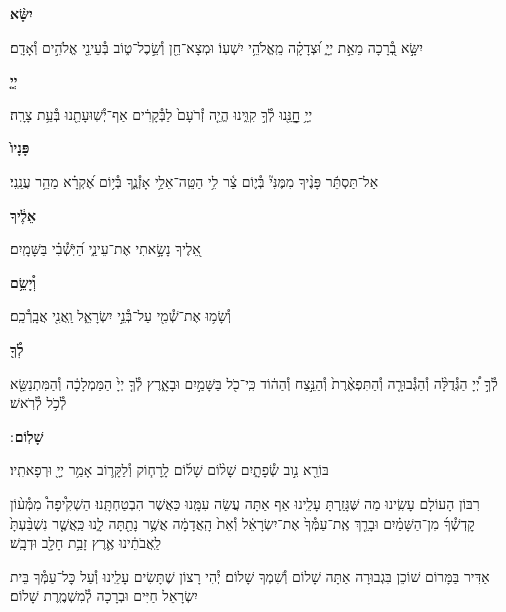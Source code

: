 \documentclass[twoside, openany, parskip=half, 11pt]{book}
\begin{document}
\textbf{יִשָּׂ֨א}
\hfill \begin{footnotesize}
יִשָּׂ֣א בְ֭֯רָכָה מֵאֵ֣ת יְיָ֑ וּ֝צְדָקָ֗ה מֵֽאֱלֹהֵ֥י יִשְׁעֽוֹ׃ וּמְצָא־חֵ֖ן וְ֯שֵׂ֣כֶל־ט֑וֹב בְּ֯עֵינֵ֖י אֱלֹהִ֣ים וְ֯אָדָֽם׃\\
\end{footnotesize}
\textbf{יְיָ֤}
\hfill \begin{footnotesize}
יְיָ֥ חׇׇׇׇׇנֵּ֖נוּ לְ֯ךָ֣ קִוִּ֑ינוּ הֱיֵ֤ה זְ֯רֹעָם֙ לַבְּ֯קָרִ֔ים אַף־יְ֯שֽׁוּעָתֵ֖נוּ בְּ֯עֵ֥ת צָרָֽה׃\\
\end{footnotesize}
\textbf{פָּנָיו֙}
\hfill \begin{footnotesize}
אַל־תַּסְתֵּ֬ר פָּנֶ֨יךָ מִמֶּנִּי֘ בְּ֯י֢וֹם צַ֫ר לִ֥י הַטֵּֽה־אֵלַ֥י אָזְ֯נֶ֑ךָ
בְּ֯י֥וֹם אֶ֝קְרָ֗א מַהֵ֥ר עֲנֵֽנִי׃\\
\end{footnotesize}
\textbf{אֵלֶ֔יךָ}
\hfill \begin{footnotesize}
אֵ֭לֶיךָ נָשָׂ֣אתִי אֶת־עֵינַ֑י הַ֝יֹּֽשְׁ֯בִ֗י בַּשָּׁמָֽיִם׃\\
\end{footnotesize}
\textbf{וְ֯יָשֵׂ֥ם}
\hfill \begin{footnotesize}
וְ֯שָׂמ֥וּ אֶת־שְׁ֯מִ֖י עַל־בְּ֯נֵ֣י יִשְׂרָאֵ֑ל וַֽאֲנִ֖י אֲבָֽרְ֯כֵֽם׃\\
\end{footnotesize}
\textbf{לְ֯ךָ֖}
\hfill \begin{footnotesize}
לְ֯ךָ֣ יְ֠יָ הַגְּ֯דֻלָּ֨ה וְ֯הַגְּ֯בוּרָ֤ה וְ֯הַתִּפְאֶ֨רֶת֙ וְ֯הַנֵּ֣צַח וְ֯הַה֔וֹד
כִּֽי־כֹ֖ל בַּשָּׁמַ֣יִם וּבָאָ֑רֶץ לְ֯ךָ֤ יְיָ֙ הַמַּמְלָכָ֔ה וְ֯הַמִּתְנַשֵּׂ֖א
לְ֯כֹ֥ל לְ֯רֹֽאשׁ׃\\
\end{footnotesize}
\textbf{שָׁלֽוֹם}
׃ \hfill \begin{footnotesize}
בּוֹרֵ֖א נִ֣וב שְׂ֯פָתָ֑יִם שָׁל֨וֹם שָׁל֜וֹם לָֽרָח֧וֹק וְ֯לַקָּר֛וֹב
אָמַ֥ר יְיָ֖ וּרְפָאתִֽיו׃
\end{footnotesize}

\clearpage

\begin{paracol}{2}
רִבּוֹן הָעוֹלָם עָשִֽׂינוּ מַה שֶּׁגָּזַֽרְתָּ עָלֵֽינוּ אַף אַתָּה עֲשֵׂה עִמָּֽנוּ כַּאֲשֶׁר הִבְטַחְתָּֽנוּ׃ הַשְׁקִ֩יפָה֩ מִמְּ֯ע֨וֹן קׇדְשְׁ֯ךָ֜ מִן־הַשָּׁמַ֗יִם וּבָרֵ֤ךְ אֶֽת־עַמְּ֯ךָ֙ אֶת־יִשְׂרָאֵ֔ל וְ֯אֵת֙ הָֽאֲדָמָ֔ה אֲשֶׁ֥ר נָתַ֖תָּה לָ֑נוּ כַּֽאֲשֶׁ֤ר נִשְׁבַּ֨עְתָּ֙ לַֽאֲבֹתֵ֔ינוּ אֶ֛רֶץ זָבַ֥ת חָלָ֖ב וּדְבָֽשׁ׃

\switchcolumn

\kahal
אַדִּיר בַּמָּרוֹם שׁוֹכֵן בִּגְבוּרָה אַתָּה שָׁלוֹם וְ֯שִׁמְךָ שָׁלוֹם׃ יְ֯הִי רָצוֹן שֶׁתָּשִׂים עָלֵֽינוּ וְ֯עַל כׇּל־עַמְּ֯ךָ בֵּית יִשְׂרָאֵל חַיִּים וּבְרָכָה לְ֯מִשְׁמֶֽרֶת שָׁלוֹם׃
\end{paracol}
\end{document}
